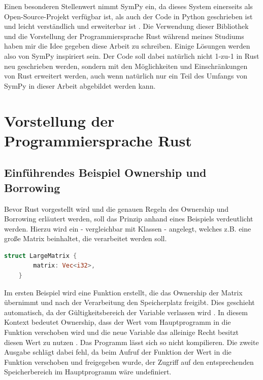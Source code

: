 \documentclass[11pt,a4paper, ngerman]{article}
\begin{document}
Einen besonderen Stellenwert nimmt SymPy ein, da dieses System einerseits als Open-Source-Projekt verfügbar ist, als auch der Code in Python geschrieben ist und leicht verständlich und erweiterbar ist \cite[S. 1]{SympyPeerJ}. Die Verwendung dieser Bibliothek und die Vorstellung der Programmiersprache Rust während meines Studiums haben mir die Idee gegeben diese Arbeit zu schreiben. Einige Lösungen werden also von SymPy inspiriert sein. Der Code soll dabei natürlich nicht 1-zu-1 in Rust neu geschrieben werden, sondern mit den Möglichkeiten und Einschränkungen von Rust erweitert werden, auch wenn natürlich nur ein Teil des Umfangs von SymPy in dieser Arbeit abgebildet werden kann.

\newpage

\section{Vorstellung der Programmiersprache Rust}
\subsection{Einführendes Beispiel Ownership und Borrowing}
Bevor Rust vorgestellt wird und die genauen Regeln des Ownership und Borrowing erläutert werden, soll das Prinzip anhand eines Beispiels verdeutlicht werden. Hierzu wird ein  - vergleichbar mit Klassen - angelegt, welches z.B. eine große Matrix beinhaltet, die verarbeitet werden soll.

\begin{lstlisting}[language=rust, caption={Einführendes Beispiel struct}]
    struct LargeMatrix {
        matrix: Vec<i32>,
    }
\end{lstlisting}

 Im ersten Beispiel wird eine Funktion erstellt, die das Ownership der Matrix übernimmt und nach der Verarbeitung den Speicherplatz freigibt. Dies geschieht automatisch, da der Gültigkeitsbereich der Variable  verlassen wird \cite{RustOwnershipFreed}. In diesem Kontext bedeutet Ownership, dass der Wert vom Hauptprogramm in die Funktion verschoben wird und die neue Variable  das alleinige Recht besitzt diesen Wert zu nutzen \cite{RustMovingTerm}. Das Programm lässt sich so nicht kompilieren. Die zweite Ausgabe schlägt dabei fehl, da beim Aufruf der Funktion der Wert in die Funktion verschoben und freigegeben wurde, der Zugriff auf den entsprechenden Speicherbereich im Hauptprogramm wäre undefiniert.
\end{document}
